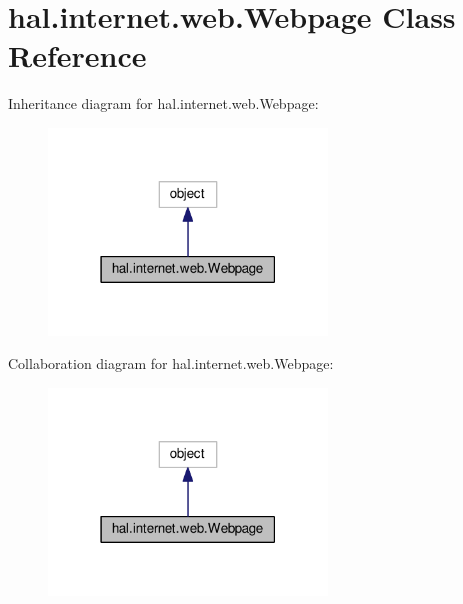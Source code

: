 \hypertarget{classhal_1_1internet_1_1web_1_1_webpage}{}\section{hal.\+internet.\+web.\+Webpage Class Reference}
\label{classhal_1_1internet_1_1web_1_1_webpage}


Inheritance diagram for hal.\+internet.\+web.\+Webpage\+:
\nopagebreak
\begin{figure}[H]
\begin{center}
\leavevmode
\includegraphics[width=210pt]{classhal_1_1internet_1_1web_1_1_webpage__inherit__graph}
\end{center}
\end{figure}


Collaboration diagram for hal.\+internet.\+web.\+Webpage\+:
\nopagebreak
\begin{figure}[H]
\begin{center}
\leavevmode
\includegraphics[width=210pt]{classhal_1_1internet_1_1web_1_1_webpage__coll__graph}
\end{center}
\end{figure}
